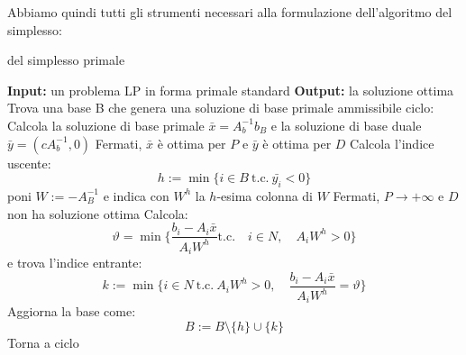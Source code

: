 \documentclass[a4paper,11pt]{article}
\begin{document}
Abbiamo quindi tutti gli strumenti necessari alla formulazione dell'algoritmo del simplesso:
\begin{algorithm}[H]
\caption{del simplesso primale}
\begin{algorithmic}
	\STATE \textbf{Input:} un problema LP in forma primale standard
	\STATE \textbf{Output:} la soluzione ottima 
	\STATE Trova una base B che genera una soluzione di base primale ammissibile
	\STATE \textsf{ciclo:}
	\STATE Calcola la soluzione di base primale $\bar{x} = A_b^{-1} b_B$ e la soluzione di base duale $\bar{y} = (cA_b^{-1}, 0)$
		\STATE Fermati, $\bar{x}$ è ottima per $P$ e $\bar{y}$ è ottima per $D$
\ELSE
		\STATE Calcola l'indice uscente: 
		$$
		h := \min\{ i \in B \ \text{t.c.} \ \bar{y_i} < 0 \}
		$$
		poni $W := -A_B^{-1}$ e indica con $W^h$ la $h$-esima colonna di $W$
	\ENDIF
		\STATE Fermati, $P \rightarrow +\infty$ e $D$ non ha soluzione ottima
	\ELSE
		\STATE Calcola:
		$$
		\vartheta = \min\{ \frac{b_i - A_i \bar{x}}{A_i W^h} \text{t.c.} \quad i \in N, \quad A_i W^h > 0 \}
		$$
		e trova l'indice entrante: 
		$$ 
		k := \min\{ i \in N \ \text{t.c.} \ A_i W^h > 0, \quad \frac{b_i - A_i \bar{x}}{A_i W^h} = \vartheta \} 
		$$
	\ENDIF
	\STATE Aggiorna la base come:
	$$
	B := B \setminus \{h\} \cup \{k\}
	$$
	\STATE Torna a \textsf{ciclo}
\end{algorithmic}
\end{algorithm}
\end{document}

